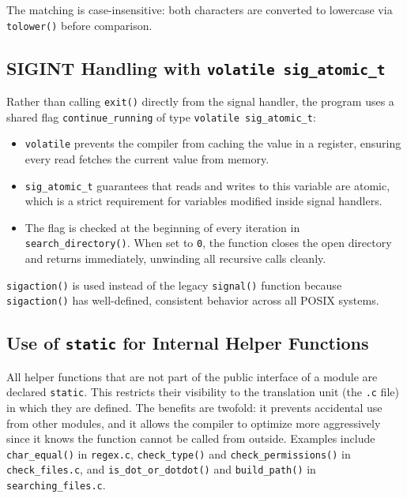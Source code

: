 \documentclass[12pt, a4paper]{article}
\begin{document}
The matching is case-insensitive: both characters are converted to lowercase via
\texttt{tolower()} before comparison.

\subsection{SIGINT Handling with \texttt{volatile sig\_atomic\_t}}

Rather than calling \texttt{exit()} directly from the signal handler, the program uses a
shared flag \texttt{continue\_running} of type \texttt{volatile sig\_atomic\_t}:

\begin{itemize}[noitemsep]
    \item \texttt{volatile} prevents the compiler from caching the value in a register,
          ensuring every read fetches the current value from memory.
    \item \texttt{sig\_atomic\_t} guarantees that reads and writes to this variable are
          atomic, which is a strict requirement for variables modified inside signal handlers.
    \item The flag is checked at the beginning of every iteration in \texttt{search\_directory()}.
          When set to \texttt{0}, the function closes the open directory and returns immediately,
          unwinding all recursive calls cleanly.
\end{itemize}

\texttt{sigaction()} is used instead of the legacy \texttt{signal()} function because
\texttt{sigaction()} has well-defined, consistent behavior across all POSIX systems.

\subsection{Use of \texttt{static} for Internal Helper Functions}

All helper functions that are not part of the public interface of a module are declared
\texttt{static}. This restricts their visibility to the translation unit (the \texttt{.c} file)
in which they are defined. The benefits are twofold: it prevents accidental use from other
modules, and it allows the compiler to optimize more aggressively since it knows the function
cannot be called from outside. Examples include \texttt{char\_equal()} in \texttt{regex.c},
\texttt{check\_type()} and \texttt{check\_permissions()} in \texttt{check\_files.c}, and
\texttt{is\_dot\_or\_dotdot()} and \texttt{build\_path()} in \texttt{searching\_files.c}.
\end{document}
